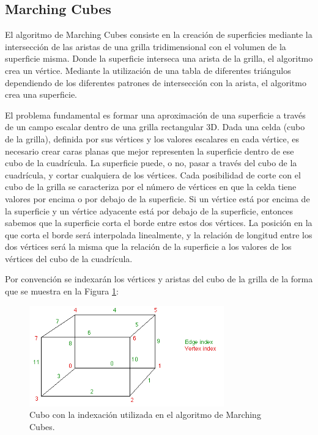 \documentclass[12pt]{article}
\begin{document}
\subsection{Marching Cubes}
\noindent El algoritmo de Marching Cubes\cite{marching}\cite{marchingcubes} consiste en la creación de superficies mediante la intersección de las aristas de una grilla tridimensional con el volumen de la superficie misma. Donde la superficie interseca una arista de la grilla, el algoritmo crea un vértice. Mediante la utilización de una tabla de diferentes triángulos dependiendo de los diferentes patrones de intersección con la arista, el algoritmo crea una superficie.

El problema fundamental es formar una aproximación de una superficie a través de un campo escalar dentro de una grilla rectangular 3D. Dada una celda (cubo de la grilla), definida por sus vértices y los valores escalares en cada vértice, es necesario crear caras planas que mejor representen la superficie dentro de ese cubo de la cuadrícula. La superficie puede, o no, pasar a través del cubo de la cuadrícula, y cortar cualquiera de los vértices. Cada posibilidad de corte con el cubo de la grilla se caracteriza por el número de vértices en que la celda tiene valores por encima o por debajo de la superficie. Si un vértice está por encima de la superficie y un vértice adyacente está por debajo de la superficie, entonces sabemos que la superficie corta el borde entre estos dos vértices. La posición en la que corta el borde será interpolada linealmente, y la relación de longitud entre los dos vértices será la misma que la relación de la superficie a los valores de los vértices del cubo de la cuadrícula.

Por convención se indexarán los vértices y aristas del cubo de la grilla de la forma que se muestra en la Figura \ref{mc1}:
\begin{figure}[h!]
\includegraphics[width=0.75\textwidth,center]{marchingcubes1.png}
\caption{Cubo con la indexación utilizada en el algoritmo de Marching Cubes.}
\label{mc1}
\end{figure}
\end{document}
